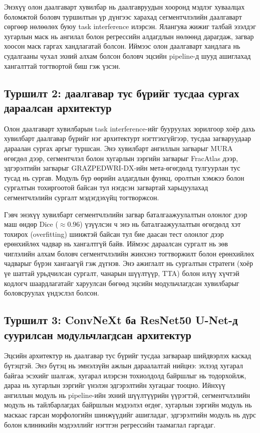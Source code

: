 Энэхүү олон даалгаварт хувилбар нь даалгавруудын хооронд мэдлэг хуваалцах боломжтой боловч туршилтын үр дүнгээс харахад сегментчлэлийн даалгаварт сөргөөр нөлөөлөх буюу task interference илэрсэн. Ялангуяа жижиг талбай эзэлдэг хугарлын маск нь ангилал болон регрессийн алдагдлын нөлөөнд дарагдаж, загвар хоосон маск гаргах хандлагатай болсон. Иймээс олон даалгаварт хандлага нь судалгааны чухал эхний алхам болсон боловч эцсийн pipeline-д шууд ашиглахад хангалттай тогтвортой биш гэж үзсэн.

\subsection{Туршилт 2: даалгавар тус бүрийг тусдаа сургах дараалсан архитектур}

Олон даалгаварт хувилбарын task interference-ийг бууруулах зорилгоор хоёр дахь хувилбарт даалгавар бүрийг нэг архитектурт нэгтгэхгүйгээр, тусдаа загваруудаар дараалан сургах аргыг туршсан. Энэ хувилбарт ангиллын загварыг MURA өгөгдөл дээр, сегментчлэл болон хугарлын зэргийн загварыг FracAtlas дээр, эдгэрэлтийн загварыг GRAZPEDWRI-DX-ийн мета-өгөгдөлд тулгуурлан тус тусад нь сургав. Модуль бүр өөрийн алдагдлын функц, оролтын хэмжээ болон сургалтын тохиргоотой байсан тул нэгдсэн загвартай харьцуулахад сегментчлэлийн сургалт мэдэгдэхүйц тогтворжсон.

Гэвч энэхүү хувилбарт сегментчлэлийн загвар баталгаажуулалтын олонлог дээр маш өндөр Dice (\(\approx 0.96\)) үзүүлсэн ч энэ нь баталгаажуулалтын өгөгдөлд хэт тохирох (overfitting) шинжтэй байсан тул бие даасан тест олонлог дээр ерөнхийлөх чадвар нь хангалтгүй байв. Иймээс дараалсан сургалт нь зөв чиглэлийн алхам боловч сегментчлэлийн жинхэнэ тогтворжилт болон ерөнхийлөх чадварыг бүрэн хангаагүй гэж дүгнэв. Энэ ажиглалт нь сургалтын стратеги (хоёр үе шаттай урьдчилсан сургалт, чанарын шүүлтүүр, TTA) болон илүү хүчтэй кодлогч шаардлагатайг харуулсан бөгөөд эцсийн модульчлагдсан хувилбарыг боловсруулах үндэслэл болсон.

\subsection{Туршилт 3: ConvNeXt ба ResNet50 U-Net-д суурилсан модульчлагдсан архитектур}

Эцсийн архитектур нь даалгавар тус бүрийг тусдаа загвараар шийдвэрлэх каскад бүтэцтэй. Энэ бүтэц нь эмнэлзүйн ажлын дараалалтай нийцнэ: эхлээд хугарал байгаа эсэхийг шалгаж, хугарал илэрсэн тохиолдолд байршлыг нь тодорхойлж, дараа нь хугарлын зэргийг үнэлэн эдгэрэлтийн хугацааг тооцно. Ийнхүү ангиллын модуль нь pipeline-ийн эхний шүүлтүүрийн үүрэгтэй, сегментчлэлийн модуль нь тайлбарлагдах байршлын мэдээлэл өгдөг, хугарлын зэргийн модуль нь маскаас гарсан морфологийн шинжүүдийг ашигладаг, эдгэрэлтийн модуль нь дүрс болон клиникийн мэдээллийг нэгтгэн регрессийн таамаглал гаргадаг.

